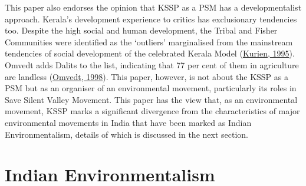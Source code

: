 \documentclass[twoside, 13pt]{article}
\begin{document}
{This paper also endorses the opinion that KSSP as a PSM has a developmentalist approach. Kerala’s development experience to critics has exclusionary tendencies too. Despite the high social and human development, the Tribal and Fisher Communities were identified as the ‘outliers’ marginalised from the mainstream tendencies of social development of the celebrated Kerala Model (\underline{Kurien, 1995}). Omvedt adds Dalits to the list, indicating that 77 per cent of them in agriculture are landless (\underline{Omvedt, 1998}). This paper, however, is not about the KSSP as a PSM but as an organiser of an environmental movement, particularly its roles in Save Silent Valley Movement. This paper has the view that, as an environmental movement, KSSP marks a significant divergence from the characteristics of major environmental movements in India that have been marked as Indian Environmentalism, details of which is discussed in the next section.} 


\vspace{.2cm}

{\fontsize{18}{20}\selectfont\section*{Indian Environmentalism}}

\vspace{-.5cm}
\end{document}
